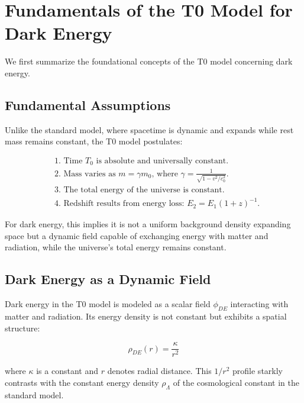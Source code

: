 \documentclass[a4paper,12pt]{article}
\theoremstyle{definition}
\theoremstyle{remark}
\begin{document}
	\section{Fundamentals of the T0 Model for Dark Energy}
	We first summarize the foundational concepts of the T0 model concerning dark energy.
	
	\subsection{Fundamental Assumptions}
	Unlike the standard model, where spacetime is dynamic and expands while rest mass remains constant, the T0 model postulates:
	
	\begin{tcolorbox}[colback=blue!5!white,colframe=blue!75!black,title=Fundamental Assumptions of the T0 Model]
		\begin{align}
			&\text{1. Time $T_0$ is absolute and universally constant.} \\
			&\text{2. Mass varies as $m = \gamma m_0$, where $\gamma = \frac{1}{\sqrt{1-v^2/c_0^2}}$.} \\
			&\text{3. The total energy of the universe is constant.} \\
			&\text{4. Redshift results from energy loss: $E_2 = E_1(1+z)^{-1}$.}
		\end{align}
	\end{tcolorbox}
	
	For dark energy, this implies it is not a uniform background density expanding space but a dynamic field capable of exchanging energy with matter and radiation, while the universe’s total energy remains constant.
	
	\subsection{Dark Energy as a Dynamic Field}
	Dark energy in the T0 model is modeled as a scalar field $\phi_{DE}$ interacting with matter and radiation. Its energy density is not constant but exhibits a spatial structure:
	
	\begin{equation}
		\rho_{DE}(r) = \frac{\kappa}{r^2}
	\end{equation}
	
	where $\kappa$ is a constant and $r$ denotes radial distance. This $1/r^2$ profile starkly contrasts with the constant energy density $\rho_\Lambda$ of the cosmological constant in the standard model.
	
\end{document}
